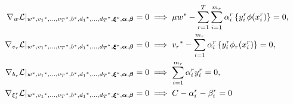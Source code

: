\begin{align}
    \grad_{{w}} \lagr \vert_{\optim{{w}}, \optim{{v}_1}, \ldots, \optim{{v}_\ntasks}, \optim{b}, \optim{d_1}, \ldots, \optim{d_\ntasks}, \optim{\fv{\xi}}, {\fv{\alpha}}, {\fv{\beta}}} = 0  &\implies \mu \optim{{w}} - \sum_{r= 1}^T \sum_{i=1}^{m_r} {\alpha_i^r} \left\lbrace y_i^r \phi(x_i^r) \right\rbrace = 0 , \label{eq:common_repr_add} \\
    \grad_{{v}_r} \lagr \vert_{\optim{{w}}, \optim{{v}_1}, \ldots, \optim{{v}_\ntasks}, \optim{b}, \optim{d_1}, \ldots, \optim{d_\ntasks}, \optim{\fv{\xi}}, {\fv{\alpha}}, {\fv{\beta}}} = 0 &\implies \optim{{v}_r} - \sum_{i=1}^{m_r} {\alpha_i^r} \left\lbrace y_i^r \phi_r(x_i^r) \right\rbrace = 0 , \label{eq:specific_repr_add} \\
    \grad_{b_r} \lagr \vert_{\optim{{w}}, \optim{{v}_1}, \ldots, \optim{{v}_\ntasks}, \optim{b}, \optim{d_1}, \ldots, \optim{d_\ntasks}, \optim{\fv{\xi}}, {\fv{\alpha}}, {\fv{\beta}}} = 0 &\implies \sum_{i=1}^{m_r} {\alpha_i^r} y_i^r = 0 , \label{eq:specific_eqconstr_add} \\
    \grad_{\xi_i^r} \lagr \vert_{\optim{{w}}, \optim{{v}_1}, \ldots, \optim{{v}_\ntasks}, \optim{b}, \optim{d_1}, \ldots, \optim{d_\ntasks}, \optim{\fv{\xi}}, {\fv{\alpha}}, {\fv{\beta}}} = 0 &\implies C - {\alpha_i^r} - {\beta_i^r} = 0 \label{eq:xi_feas_add}
\end{align}
